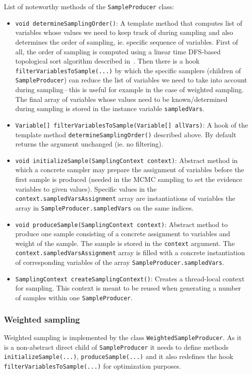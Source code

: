 \documentclass[english,cover]{fitthesis} %
\newcommand{\srccode}[1]{{\tt #1}}         %
\begin{document}
\medskip
List of noteworthy methods of the \srccode{SampleProducer} class:
\begin{itemize}
	\item \srccode{void determineSamplingOrder()}: A template method that computes list of variables whose values we need to keep track of during sampling and also determines the order of sampling, ie. specific sequence of variables. First of all, the order of sampling is computed using a linear time DFS-based topological sort algorithm described in~\cite{cormen_introduction_to_algorithms}. Then there is a hook \srccode{filterVariablesToSample(...)} by which the specific samplers (children of \srccode{SampleProducer}) can reduce the list of variables we need to take into account during sampling\,--\,this is useful for example in the case of weighted sampling. The final array of variables whose values need to be known/determined during sampling is stored in the instance variable \srccode{sampledVars}.
	\item \srccode{Variable[] filterVariablesToSample(Variable[] allVars)}: A hook of the template method \srccode{determineSamplingOrder()} described above. By default returns the argument unchanged (ie. no filtering).
	\item \srccode{void initializeSample(SamplingContext context)}: Abstract method in which a concrete sampler may prepare the assignment of variables before the first sample is produced (needed in the MCMC sampling to set the evidence variables to given values). Specific values in the \srccode{context.sampledVarsAssignment} array are instantiations of variables the array in \srccode{SampleProducer.sampledVars} on the same indices.
	\item \srccode{void produceSample(SamplingContext context)}: Abstract method to produce one sample consisting of a concrete assignment to variables and weight of the sample. The sample is stored in the \srccode{context} argument. The \srccode{context.sampledVarsAssignment} array is filled with a concrete instantiation of corresponding variables of the array \srccode{SampleProducer.sampledVars}.
	\item \srccode{SamplingContext createSamplingContext()}: Creates a thread-local context for sampling. This context is meant to be reused when generating a number of samples within one \srccode{SampleProducer}.
\end{itemize}


\subsubsection{Weighted sampling}
Weighted sampling is implemented by the class \srccode{WeightedSampleProducer}. As it is a non-abstract direct child of \srccode{SampleProducer} it needs to define methods \srccode{initializeSample(...)}, \srccode{produceSample(...)} and it also redefines the hook \srccode{filterVariablesToSample(...)} for optimization purposes.
\end{document}
